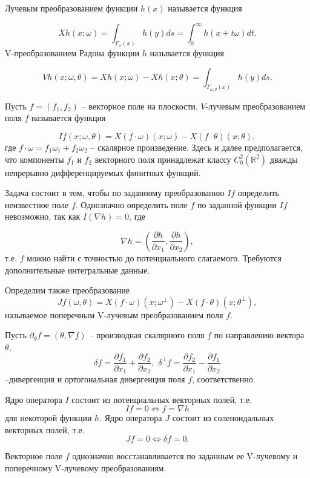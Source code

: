 Лучевым преобразованием функции $h(x)$ называется функция

$$Xh(x;\omega)=\int_{\Gamma_\omega (x)} h(y)ds=\int_0^\infty h(x+t\omega)dt.$$
V-преобразованием Радона функции $h$ называется функция

$$Vh(x;\omega,\theta)=Xh(x;\omega)-Xh(x;\theta)=\int_{\Gamma_{\omega,\theta}(x)} h(y)ds.$$

Пусть $f=(f_1,f_2 )$ -- векторное поле на плоскости. $V$-лучевым преобразованием поля $f$ называется функция

$$If(x;\omega,\theta)=X(f\cdot\omega)(x;\omega)-X(f\cdot\theta)(x;\theta),$$
где $f\cdot\omega=f_1 \omega_1+f_2 \omega_2$ -- скалярное произведение. Здесь и далее предполагается, что компоненты $f_1$ и $f_2$ векторного поля принадлежат классу $C_0^2 (\mathbb R^2 )$ дважды непрерывно дифференцируемых финитных функций.


Задача состоит в том, чтобы по заданному преобразованию $If$ определить неизвестное поле $f$. Однозначно определить поле $f$ по заданной функции $If$ невозможно, так как $I(\nabla h)=0$, где 

$$\nabla h=\left(\frac{\partial h}{\partial x_1},\frac{\partial h}{\partial x_2}\right),$$
т.е. $f$ можно найти с точностью до потенциального слагаемого. Требуются дополнительные интегральные данные.

Определим также преобразование
$$Jf(\omega,\theta)=X(f\cdot \omega)(x;\omega^\bot )-X(f\cdot\theta)(x;\theta^\bot),$$
называемое поперечным V-лучевым преобразованием поля $f$.

Пусть $\partial_\theta f=(\theta,\nabla f)$ -- производная скалярного поля $f$ по направлению вектора $\theta$, 
$$\delta f=\frac{\partial f_1}{\partial x_1}+\frac{\partial f_2}{\partial x_2},\,\, \delta^\bot f=\frac{\partial f_2}{\partial x_1}-\frac{\partial f_1}{\partial x_2}$$
--дивергенция и ортогональная дивергенция поля $f$, соответственно.


\begin{theorem} Ядро оператора $I$ состоит из потенциальных векторных полей, т.е.
$$If=0 \Leftrightarrow f=\nabla h$$ 
для некоторой функции $h$.
Ядро оператора $J$ состоит из соленоидальных векторных полей, т.е.
$$Jf=0  \Leftrightarrow  \delta f=0.$$
\end{theorem}

\begin{theorem} Векторное поле $f$ однозначно восстанавливается по заданным ее V-лучевому и поперечному V-лучевому преобразованиям.
\end{theorem}

